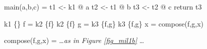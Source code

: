 \begin{minipage}{5in}%
\begin{center}%
\begin{minipage}{4in}%
\begin{AVerb}[numbers=left]
main(a,b,c) = \label{fig_mil2_main}
  t1 <- k1 @ a \label{fig_mil2_t1}
  t2 <- t1 @ b \label{fig_mil2_t2}
  t3 <- t2 @ c \label{fig_mil2_t3}
  return t3

k1 \{\} f = k2 \{f\} \label{fig_mil2_k1}
k2 \{f\} g = k3 \{f,g\} \label{fig_mil2_k2}
k3 \{f,g\} x = compose(f,g,x) \label{fig_mil2_k3}

compose(f,g,x) = \dots \emph{as in Figure \ref{fig_mil1b}} \dots 
\end{AVerb}
\end{minipage}%
\end{center}%
\end{minipage}%
